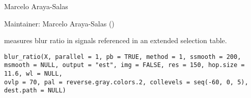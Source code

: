 \documentclass[letterpaper]{book}
\begin{document}
%
\begin{Author}\relax
Marcelo Araya-Salas

Maintainer: Marcelo Araya-Salas ()
\end{Author}
%
\begin{Description}\relax
{} measures blur ratio in signals referenced in an extended selection table.
\end{Description}
%
\begin{Usage}
\begin{verbatim}
blur_ratio(X, parallel = 1, pb = TRUE, method = 1, ssmooth = 200, 
msmooth = NULL, output = "est", img = FALSE, res = 150, hop.size = 11.6, wl = NULL, 
ovlp = 70, pal = reverse.gray.colors.2, collevels = seq(-60, 0, 5), dest.path = NULL)
\end{verbatim}
\end{Usage}
%
\end{document}
